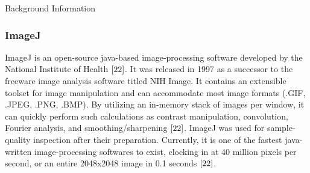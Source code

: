 \documentclass[a4paper,12pt]{article}
\begin{document}
\begin{section}{Background Information}
\subsubsection{ImageJ}

ImageJ is an open-source java-based image-processing software developed by the National Institute of Health $\cite{22}$. It was released in 1997 as a successor to the freeware image analysis software titled NIH Image. It contains an extensible toolset for image manipulation and can accommodate most image formats (.GIF, .JPEG, .PNG, .BMP). By utilizing an in-memory stack of images per window, it can quickly perform such calculations as contrast manipulation, convolution, Fourier analysis, and smoothing/sharpening $\cite{22}$. ImageJ was used for sample-quality inspection after their preparation. Currently, it is one of the fastest java-written image-processing softwares to exist, clocking in at 40 million pixels per second, or an entire 2048x2048 image in 0.1 seconds $\cite{22}$.

\end{section}
\end{document}
